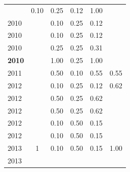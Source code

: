 \begin{table}[H]
\begin{tabular}{| l | c | c | c | c | c |}
          &
          0.10
          &
          0.25
          &
          0.12
          &
            {\color{blue} 1.00}
          \\
            2010
          &
          
          &
          0.10
          &
          0.25
          &
          0.12
          &
          \\
            2010
          &
          
          &
          0.10
          &
          0.25
          &
          0.12
          &
          \\
            2010
          &
          
          &
          0.25
          &
          0.25
          &
          0.31
          &
          \\
            {\bf 2010}
          &
          
          &
          1.00
          &
          0.25
          &
          1.00
          &
          \\
\hline
            2011
          &
          
          &
          0.50
          &
          0.10
          &
          0.55
          &
            {\color{blue} 0.55}
          \\
\hline
            2012
          &
          
          &
          0.10
          &
          0.25
          &
          0.12
          &
            {\color{blue} 0.62}
          \\
            2012
          &
          
          &
          0.50
          &
          0.25
          &
          0.62
          &
          \\
            2012
          &
          
          &
          0.50
          &
          0.25
          &
          0.62
          &
          \\
            2012
          &
          
          &
          0.10
          &
          0.50
          &
          0.15
          &
          \\
            2012
          &
          
          &
          0.10
          &
          0.50
          &
          0.15
          &
          \\
\hline
            2013
          &
          1
          &
          0.10
          &
          0.50
          &
          0.15
          &
            {\color{blue} 1.00}
          \\
            2013
          &
          

\end{tabular}
\end{table}
